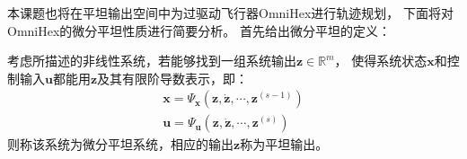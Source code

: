本课题也将在平坦输出空间中为过驱动飞行器OmniHex进行轨迹规划，
下面将对OmniHex的微分平坦性质进行简要分析。
首先给出微分平坦的定义：
\begin{definition}[（微分平坦）]
    \label{def:differential_flatness}
    考虑所描述的非线性系统，若能够找到一组系统输出$\bm{z} \in \mathbb{R}^m$，
    使得系统状态$\bm{x}$和控制输入$\bm{u}$都能用$\bm{z}$及其有限阶导数表示，即：
    \begin{gather}
        \bm{x} = \bm{\varPsi}_{\bm{x}}(\bm{z}, \dot{\bm{z}}, \cdots, \bm{z}^{(s-1)}) \label{equ:state_flat_map} \\
        \bm{u} =  \bm{\varPsi}_{\bm{u}}(\bm{z}, \dot{\bm{z}}, \cdots, \bm{z}^{(s)}) \label{equ:input_flat_map}
    \end{gather}
    则称该系统为微分平坦系统，相应的输出$\bm{z}$称为平坦输出。
\end{definition}

